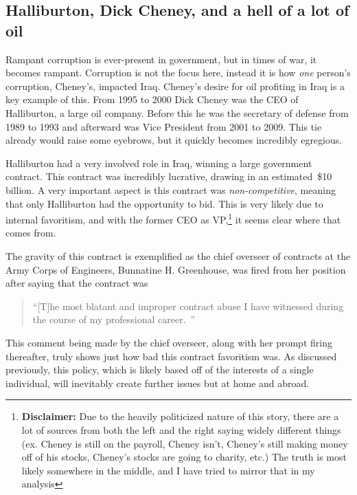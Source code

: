 \documentclass[12pt, draft]{article}
\begin{document}
    \subsection{Halliburton, Dick Cheney, and a hell of a lot of oil}
        Rampant corruption is ever-present in government, but in times of war, it becomes rampant. Corruption is not the focus here, instead it is how \textit{one} person's corruption, Cheney's, impacted Iraq. Cheney's desire for oil profiting in Iraq is a key example of this. From 1995 to 2000 Dick Cheney was the CEO of Halliburton, a large oil company. Before this he was the secretary of defense from 1989 to 1993 and afterward was Vice President from 2001 to 2009. This tie already would raise some eyebrows, but it quickly becomes incredibly egregious. 
        
        Halliburton had a very involved role in Iraq, winning a large government contract. This contract was incredibly lucrative, drawing in an estimated~\$10 billion. A very important aspect is this contract was \textit{non-competitive}, meaning that only Halliburton had the opportunity to bid. \parencite{bbc2008iraqcontracts} This is very likely due to internal favoritism, and with the former CEO as VP,\footnote{\textbf{Disclaimer:} Due to the heavily politicized nature of this story, there are a lot of sources from both the left and the right saying widely different things (ex. Cheney is still on the payroll, Cheney isn't, Cheney's still making money off of his stocks, Cheney's stocks are going to charity, etc.) The truth is most likely somewhere in the middle, and I have tried to mirror that in my analysis}
        it seems clear where that comes from. 
        
        The gravity of this contract is exemplified as the chief overseer of contracts at the Army Corps of Engineers, Bunnatine H. Greenhouse, was fired from her position after saying that the contract was 

        \begin{quote}
            ``[T]he most blatant and improper contract abuse I have witnessed during the course of my professional career.~\parencite{nytimes2005halliburtoncontract}''
        \end{quote}  

        This comment being made by the chief overseer, along with her prompt firing thereafter, truly shows just how bad this contract favoritism was. As discussed previously, this policy, which is likely based off of the interests of a single individual, will inevitably create further issues but at home and abroad.  
        
\end{document}
